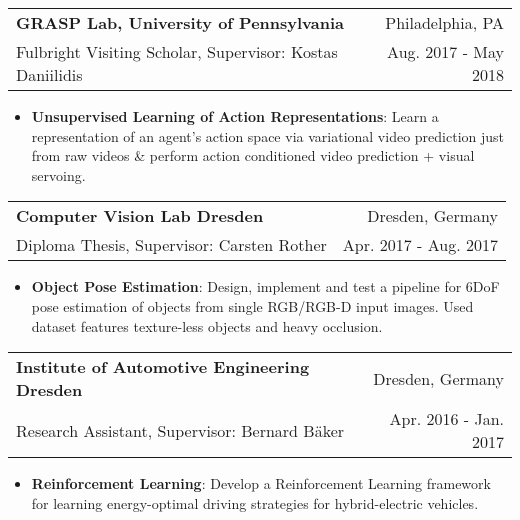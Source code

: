 \documentclass[letterpaper,11pt]{article}
\makeatletter
\newcommand{\resumeItem}[2]{
  \item\small{
    \textbf{#1}{: #2 \vspace{-2pt}}
  }
}
\newcommand{\resumeSubheading}[4]{
  \vspace{-1pt}\item
    \begin{tabular*}{0.97\textwidth}{l@{\extracolsep{\fill}}r}
      \textbf{#1} & #2 \\
      \small#3 & \small #4 \\
    \end{tabular*}\vspace{-5pt}
}
\newcommand{\resumeItemListStart}{\begin{itemize}}
\newcommand{\resumeItemListEnd}{\end{itemize}\vspace{-5pt}}
\makeatother
\begin{document}
	\resumeSubheading
	{GRASP Lab, University of Pennsylvania}{Philadelphia, PA}
	{Fulbright Visiting Scholar, Supervisor: Kostas Daniilidis}{Aug. 2017 - May 2018}
	\resumeItemListStart
	\resumeItem{Unsupervised Learning of Action Representations}
	{Learn a representation of an agent's action space via variational video prediction just from raw videos \& perform action conditioned video prediction + visual servoing.}
	\resumeItemListEnd

    \resumeSubheading
      {Computer Vision Lab Dresden}{Dresden, Germany}
      {Diploma Thesis, Supervisor: Carsten Rother}{Apr. 2017 - Aug. 2017}
      \resumeItemListStart
        \resumeItem{Object Pose Estimation}
          {Design, implement and test a pipeline for 6DoF pose estimation of objects from single RGB/RGB-D input images. Used dataset features texture-less objects and heavy occlusion.}
      \resumeItemListEnd

    \resumeSubheading
      {Institute of Automotive Engineering Dresden}{Dresden, Germany}
      {Research Assistant, Supervisor: Bernard B\"aker}{Apr. 2016 - Jan. 2017}
      \resumeItemListStart
        \resumeItem{Reinforcement Learning}
          {Develop a Reinforcement Learning framework for learning energy-optimal driving strategies for hybrid-electric vehicles. }%
      \resumeItemListEnd


\end{document}
